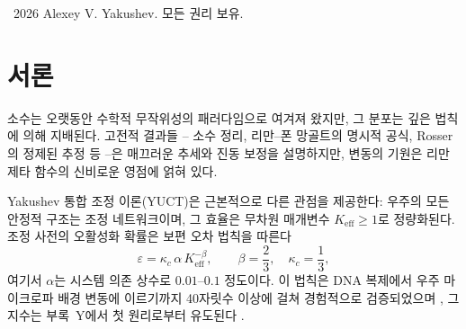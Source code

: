 \documentclass[11pt,a4paper]{article}
\newcommand{\kappac}{\kappa_c}
\begin{document}
\begin{titlepage}
\begin{abstract}
			정제된 2-루프 마스터 커널(v4.1.PURE)은 \(n=10^{11}\)에서 절대 오차가 \(+8\,248\)에 불과하며, 즉 상대 정확도 \(3\times10^{-7}\%\)를 달성하고, 어떤 경험적 매개변수도 사용하지 않는다. 우리는 \textbf{위상 의존 경험적 보정}(v15.0)을 도입하여 현재 진공 위상에 동적으로 진폭을 적응시키며, \(n=10^{12}\)에서 \(99.996\%\)의 정확도를 달성하면서 \(O(1)\) 복잡성과 제로 메모리 오버헤드를 유지한다. 멀티스레드 벤치마크는 완벽한 확장성과 에너지 효율을 확인한다.
			
			\textbf{슈테른-브로코 트리}와의 새로운 연결이 확립된다: 스케일링 양자 \(q = (3/2)^{1/3}\)는 매우 강건한 기하 구조(그 궤적의 94.4\%가 단 두 개의 4비트 매크로블록으로 구성됨)를 가짐이 보여져, 조정 사다리의 안정성을 설명한다. 슈테른-브로코 격자에 기반한 결정론적 양자 에뮬레이터가 제시되며, 중첩, 얽힘, CNOT 게이트가 유리 좌표에 대한 일반 산술 연산임을 보여준다.
			
			잔여 진동은 리만 제타 함수의 비자명 영점과 강하게 상관되어 있으며 (\(R^2>0.99\)), 오차의 3D 시각화는 진공 격자 기하와 동형인 특징적인 깔때기 모양 구조를 드러낸다. 소수 분석의 YUCT V35.0 라그랑지안(섹터~103)으로의 형식적 임베딩이 제공된다. 이 연구는 YPSDC 프로토콜(짧은 인덱스로 활성화되는 사전 분산 사전)이 소수 계산과 얽힘 및 터널링과 같은 양자 현상 모두의 기초가 됨을 보여줌으로써 양자 신비주의를 제거한다.
			
			즉시 사용 가능한 Python 스크립트(로그, 프로덕션, 거듭제곱 법칙, 위상 의존, 양자 에뮬레이터)는 GitHub에서 공개적으로 이용 가능하다.
		\end{abstract}
		
		\vspace{0.5cm}
		\textcopyright\ 2026 Alexey V. Yakushev. 모든 권리 보유.
	\end{titlepage}
	
	\tableofcontents
	\newpage
	
	\section{서론}
	소수는 오랫동안 수학적 무작위성의 패러다임으로 여겨져 왔지만, 그 분포는 깊은 법칙에 의해 지배된다. 고전적 결과들 – 소수 정리, 리만–폰 망골트의 명시적 공식, Rosser의 정제된 추정 등 –은 매끄러운 추세와 진동 보정을 설명하지만, 변동의 기원은 리만 제타 함수의 신비로운 영점에 얽혀 있다.
	
	Yakushev 통합 조정 이론(YUCT)은 근본적으로 다른 관점을 제공한다: 우주의 모든 안정적 구조는 조정 네트워크이며, 그 효율은 무차원 매개변수 \(K_{\mathrm{eff}} \ge 1\)로 정량화된다. 조정 사전의 오활성화 확률은 보편 오차 법칙을 따른다
	\begin{equation}\label{eq:errorlaw}
		\varepsilon = \kappac \, \alpha \, K_{\mathrm{eff}}^{-\beta}, \qquad \beta = \frac{2}{3},\quad \kappac = \frac{1}{3},
	\end{equation}
	여기서 \(\alpha\)는 시스템 의존 상수로 \(0.01\)–\(0.1\) 정도이다. 이 법칙은 DNA 복제에서 우주 마이크로파 배경 변동에 이르기까지 40자릿수 이상에 걸쳐 경험적으로 검증되었으며 \cite{AppendixL}, 그 지수는 부록~Y에서 첫 원리로부터 유도된다 \cite{AppendixY}.
	
\end{document}
